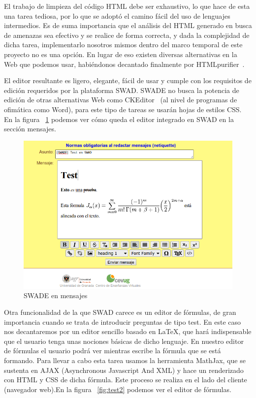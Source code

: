El trabajo de limpieza del código HTML debe ser exhaustivo, lo que hace de esta una tarea tediosa, por lo que se adoptó el camino fácil del uso de lenguajes intermedios. Es de suma importancia que el análisis del HTML generado en busca de amenazas sea efectivo y se realice de forma correcta, y dada la complejidad de dicha tarea, implementarlo nosotros mismos dentro del marco temporal de este proyecto no es una opción. En lugar de eso existen diversas alternativas en la Web que podemos usar, habiéndonos decantado finalmente por HTMLpurifier~\cite{htmlpurifier}.

El editor resultante es ligero, elegante, fácil de usar y cumple con los requisitos de edición requeridos por la plataforma SWAD. SWADE no busca la potencia de edición de otras alternativas Web como CKEditor~\cite{CKEditor:ckeditor} (al nivel de programas de ofimática como Word), para este tipo de tareas se usarán hojas de estilos CSS. En la figura ~\ref{fig:test1} podemos ver cómo queda el editor integrado en SWAD en la sección mensajes.

\begin{figure}[h!]
  \centering
      \includegraphics[width=5in]{fig/swade_test1}
  \caption{SWADE en mensajes}
  \label{fig:test1}

\end{figure}


Otra funcionalidad de la que SWAD carece es un editor de fórmulas, de gran importancia cuando se trata de introducir preguntas de tipo test. En este caso nos decantaremos por un editor sencillo basado en LaTeX, que hará indispensable que el usuario tenga unas nociones básicas de dicho lenguaje. En nuestro editor de fórmulas el usuario podrá ver mientras escribe la fórmula que se está formando. Para llevar a cabo esta tarea usamos la herramienta MathJax, que se sustenta en AJAX (Asynchronous Javascript And XML) y hace un renderizado con HTML y CSS de dicha fórmula. Este proceso se realiza en el lado del cliente (navegador web).En la figura ~\ref{fig:test2} podemos ver el editor de fórmulas.


